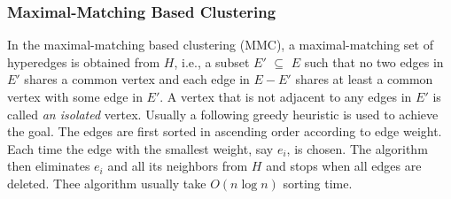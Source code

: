 \documentclass[journal]{IEEEtran}
\begin{document}
 
\subsubsection{Maximal-Matching Based Clustering}
\label{mmc}
In the maximal-matching based
clustering (MMC), a maximal-matching set of hyperedges is obtained from
$H$, i.e., a subset $E'$ $\subseteq$ $E$ such that no two edges in
$E'$ shares a common vertex and each edge in $E - E'$ shares at least
a common vertex with some edge in $E'$. A vertex that is not adjacent
to any edges in $E'$ is called  {\it an isolated} vertex. 
Usually a following
greedy heuristic is used to achieve the goal. The edges are first
sorted in ascending order according to edge weight. Each time
the edge with the smallest weight, say $e_i$, is chosen. 
The algorithm then eliminates $e_i$ and all its neighbors from $H$ and
stops when all edges are deleted. Thee algorithm usually take 
$O(n \log n)$ sorting time.

\end{document}

